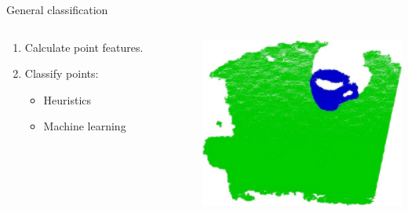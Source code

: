 \documentclass{beamer}
\begin{document}
\begin{frame}{General classification}

\begin{columns}[T]
\begin{column}{0.5\textwidth}

\begin{enumerate}
\item Calculate point features.
\item Classify points:
\begin{itemize}
\item Heuristics
\item Machine learning
\end{itemize}
\end{enumerate}

\end{column}

\begin{column}{0.5\textwidth}

\includegraphics[width=1\textwidth]{pics/segmentation.png}

\end{column}

\end{columns}


\end{frame}
\end{document}
